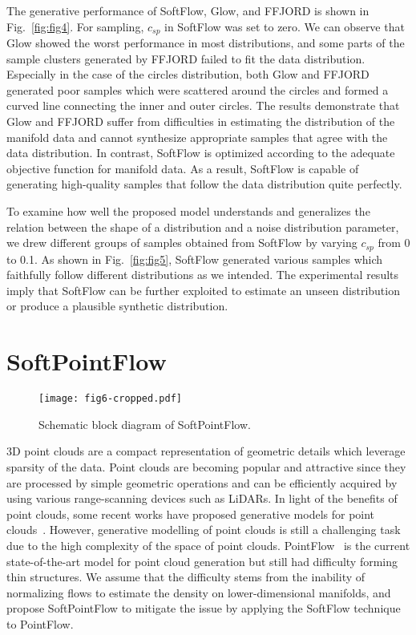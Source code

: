 \documentclass{article}
\begin{document}
The generative performance of SoftFlow, Glow, and FFJORD is shown in Fig.~\ref{fig:fig4}. For sampling, $c_{sp}$ in SoftFlow was set to zero. We can observe that Glow showed the worst performance in most distributions, and some parts of the sample clusters generated by FFJORD failed to fit the data distribution. Especially in the case of the circles distribution, both Glow and FFJORD generated poor samples which were scattered around the circles and formed a curved line connecting the inner and outer circles.
The results demonstrate that Glow and FFJORD suffer from difficulties in estimating the distribution of the manifold data and cannot synthesize appropriate samples that agree with the data distribution. In contrast, SoftFlow is optimized according to the adequate objective function for manifold data. As a result, SoftFlow is capable of generating high-quality samples that follow the data distribution quite perfectly. 

To examine how well the proposed model understands and generalizes the relation between the shape of a distribution and a noise distribution parameter, we drew different groups of samples obtained from SoftFlow by varying $c_{sp}$ from 0 to 0.1. As shown in Fig.~\ref{fig:fig5}, SoftFlow generated various samples which faithfully follow different distributions as we intended. The experimental results imply that SoftFlow can be further exploited to estimate an unseen distribution or produce a plausible synthetic distribution.

 \section{SoftPointFlow}
 \begin{figure}[t]
	\centering
	\texttt{[image: fig6-cropped.pdf]}
    \caption{Schematic block diagram of SoftPointFlow.}
	\label{fig:fig6}
\end{figure}
3D point clouds are a compact representation of geometric details which leverage sparsity of the data. Point clouds are becoming popular and attractive since they are processed by simple geometric operations and can be efficiently acquired by using various range-scanning devices such as LiDARs. In light of the benefits of point clouds, some recent works have proposed generative models for point clouds~\citep{yang2019pointflow,achlioptas2017learning,groueix2018papier}. However, generative modelling of point clouds is still a challenging task due to the high complexity of the space of point clouds. PointFlow~\citep{yang2019pointflow} is the current state-of-the-art model for point cloud generation but still had difficulty forming thin structures. We assume that the difficulty stems from the inability of normalizing flows to estimate the density on lower-dimensional manifolds, and propose SoftPointFlow to mitigate the issue by applying the SoftFlow technique to PointFlow.
\end{document}

